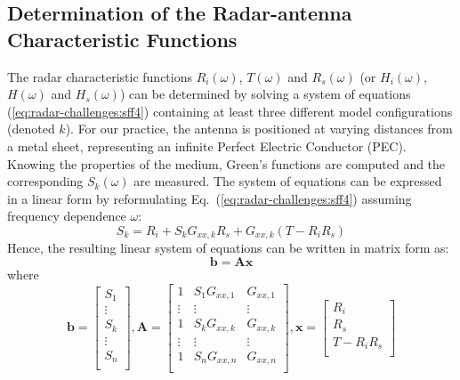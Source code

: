 \subsection{Determination of the Radar-antenna Characteristic Functions} \label{sec:radar-challenges:mathematical-theory:characteristic-functions}
The radar characteristic functions $R_i(\omega)$, $T(\omega)$ and $R_s(\omega)$ (or $H_i(\omega)$, $H(\omega)$ and $H_s(\omega)$) can be determined by solving a system of equations (\ref{eq:radar-challenges:sff4}) containing at least three different model configurations (denoted $k$). For our practice, the antenna is positioned at varying distances from a metal sheet, representing an infinite Perfect Electric Conductor (PEC). Knowing the properties of the medium, Green's functions are computed and the corresponding $S_{k}(\omega)$ are measured. The system of equations can be expressed in a linear form by reformulating Eq.~(\ref{eq:radar-challenges:sff4}) assuming frequency dependence $\omega$:
\begin{equation}\label{Art5S11r}
 S_{k} = R_i + S_{k}G_{xx,k}R_s + G_{xx,k} \left( T-R_iR_s \right)
\end{equation}
Hence, the resulting linear system of equations can be written in matrix form as:
\begin{equation}
\mathbf{b}=\mathbf{A}\mathbf{x}
\end{equation}
where
\begin{equation}
\mathbf{b}=
\begin{bmatrix}
 S_{1} \\
 \vdots \\
 S_{k} \\
 \vdots \\
 S_{n} \\
\end{bmatrix},
\mathbf{A}=
\begin{bmatrix}
 1 & S_{1}G_{xx,1} & G_{xx,1} \\
 \vdots & \vdots & \vdots \\
 1 & S_{k}G_{xx,k} & G_{xx,k} \\
 \vdots & \vdots & \vdots\\
  1 & S_{n}G_{xx,n} & G_{xx,n} \\
\end{bmatrix},
\mathbf{x}=
\begin{bmatrix}
 R_i \\
 R_s \\
 T-R_iR_s \\
\end{bmatrix}
\end{equation}


